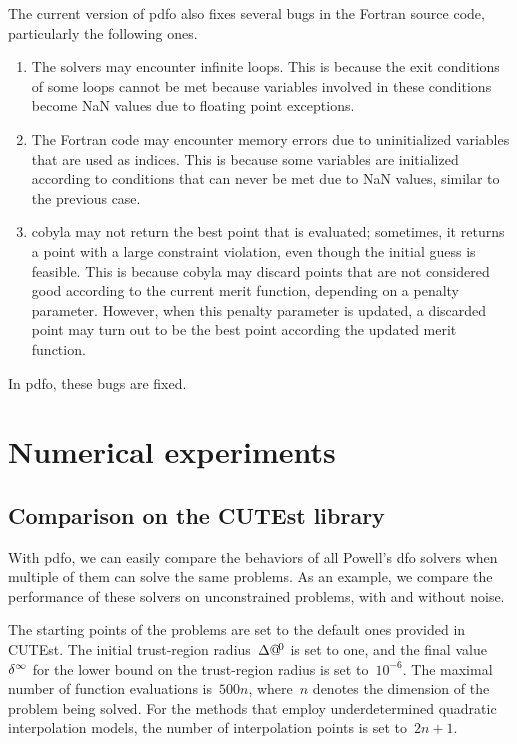 The current version of \gls{pdfo} also fixes several bugs in the Fortran source code, particularly the following ones.
\begin{enumerate}
    \item The solvers may encounter infinite loops.
    This is because the exit conditions of some loops cannot be met because variables involved in these conditions become NaN values due to floating point exceptions.
    \item The Fortran code may encounter memory errors due to uninitialized variables that are used as indices.
    This is because some variables are initialized according to conditions that can never be met due to NaN values, similar to the previous case.
    \item \Gls{cobyla} may not return the best point that is evaluated; sometimes, it returns a point with a large constraint violation, even though the initial guess is feasible.
    This is because \gls{cobyla} may discard points that are not considered good according to the current merit function, depending on a penalty parameter.
    However, when this penalty parameter is updated, a discarded point may turn out to be the best point according the updated merit function.
\end{enumerate}
In \gls{pdfo}, these bugs are fixed.


\section{Numerical experiments}
\label{sec:pdfo-experiments}

\subsection{Comparison on the CUTEst library}

With \gls{pdfo}, we can easily compare the behaviors of all Powell's \gls{dfo} solvers when multiple of them can solve the same problems.
As an example, we compare the performance of these solvers on unconstrained problems, with and without noise.

The starting points of the problems are set to the default ones provided in CUTEst.
The initial trust-region radius~$\rad[0]$ is set to one, and the final value~$\radlb[\infty]$ for the lower bound on the trust-region radius is set to~$10^{-6}$.
The maximal number of function evaluations is~$500n$, where~$n$ denotes the dimension of the problem being solved.
For the methods that employ underdetermined quadratic interpolation models, the number of interpolation points is set to~$2n + 1$.


